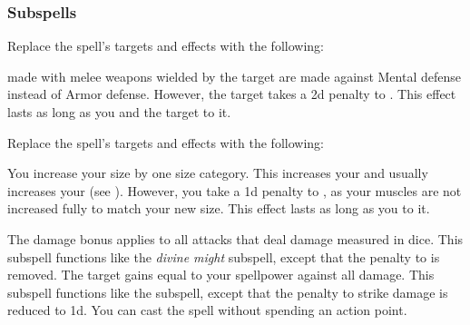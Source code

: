 \subsubsection{Subspells}
Replace the spell's targets and effects with the following:
\begin{spellcontent}
\begin{augmenttargetinginfo}
\end{augmenttargetinginfo}
\begin{augmenteffects}
\spelleffect
{} made with melee weapons wielded by the target are made against Mental defense instead of Armor defense.
However, the target takes a \minus2d penalty to .
This effect lasts as long as you and the target  to it.
\end{augmenteffects}
\end{spellcontent}
Replace the spell's targets and effects with the following:
\begin{spellcontent}
\begin{augmenttargetinginfo}
\end{augmenttargetinginfo}
\begin{augmenteffects}
\spelleffect
You increase your size by one size category.
This increases your  and usually increases your  (see ).
However, you take a \minus1d penalty to , as your muscles are not increased fully to match your new size.
This effect lasts as long as you  to it.
\end{augmenteffects}
\end{spellcontent}
The damage bonus applies to all attacks that deal damage measured in dice.
This subspell functions like the \textit{divine might} subspell, except that the penalty to  is removed.
The target gains  equal to your spellpower against all damage.
This subspell functions like the  subspell, except that the penalty to strike damage is reduced to \minus1d.
You can cast the spell without spending an action point.
